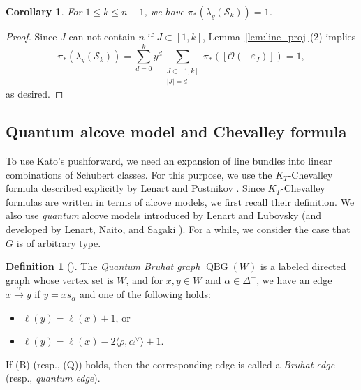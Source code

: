\documentclass[a4paper, 11pt, reqno]{amsart}
\numberwithin{equation}{section}
\newcommand{\CO}{\mathcal{O}}
\newcommand{\CS}{\mathcal{S}}
\newcommand{\ve}{\varepsilon}
\newcommand{\class}[1]{\left[ #1 \right]}
\newcommand{\pair}[2]{\langle #1, #2 \rangle}
\DeclareMathOperator{\QBG}{QBG}
\theoremstyle{plain}
\newtheorem{cor}[thm]{Corollary}
\theoremstyle{definition}
\newtheorem{defn}[thm]{Definition}
\theoremstyle{remark}
\begin{document}
\begin{cor} \label{cor:proj_lambda}
For $1 \le k \le n-1$, we have $\pi_{\ast}(\lambda_{y}(\CS_{k})) = 1$. 
\end{cor}
\begin{proof}
Since $J$ can not contain $n$ if $J \subset [1, k]$, Lemma~\ref{lem:line_proj}\,(2) implies
\begin{equation}
\pi_{\ast}(\lambda_{y}(\CS_{k})) = \sum_{d=0}^{k} y^{d} \sum_{\substack{J \subset [1, k] \\ |J|=d}} \pi_{\ast}(\class{\CO(-\ve_{J})}) = 1, 
\end{equation}
as desired. 
\end{proof}


\subsection{Quantum alcove model and Chevalley formula}
To use Kato's pushforward, we need an expansion of line bundles into linear combinations of Schubert classes. 
For this purpose, we use the $K_{T}$-Chevalley formula described explicitly by Lenart and Postnikov \cite{LP}. 
Since $K_{T}$-Chevalley formulas are written in terms of alcove models, we first recall their definition. 
We also use \emph{quantum} alcove models introduced by Lenart and Lubovsky \cite{LL} (and developed by Lenart, Naito, and Sagaki \cite{LNS}). For a while, we consider the case that $G$ is of arbitrary type. 

\begin{defn}[{\cite[Definition~6.1]{BFP}}]
The \emph{Quantum Bruhat graph} $\QBG(W)$ is a labeled directed graph whose vertex set is $W$, and for $x, y \in W$ and $\alpha \in \Delta^{+}$, we have an edge $x \xrightarrow{\alpha} y$ if $y = xs_{\alpha}$ and one of the following holds: 
\begin{itemize}
\item[(B)] $\ell(y) = \ell(x) + 1$, or 
\item[(Q)] $\ell(y) = \ell(x) - 2\pair{\rho}{\alpha^{\vee}} + 1$. 
\end{itemize}
If (B) (resp., (Q)) holds, then the corresponding edge is called a \emph{Bruhat edge} (resp., \emph{quantum edge}). 
\end{defn}
\end{document}
